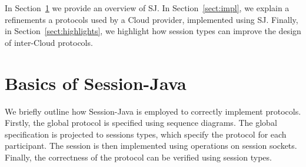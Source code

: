 \documentclass[10pt]{llncs}
\begin{document}


In Section~\ref{sect:basics} we provide an overview of SJ.
In Section~\ref{sect:impl}, we explain a refinements a protocols used by a Cloud provider, implemented using SJ. %
Finally, in Section~\ref{sect:highlights}, we highlight how session types can improve the design of inter-Cloud protocols.


\section{Basics of Session-Java}
\label{sect:basics}

We briefly outline how Session-Java is employed to correctly implement protocols.
Firstly, the global protocol is specified using sequence diagrams. The global specification is projected to sessions types, which specify the protocol for each participant.
The session is then implemented using operations on session sockets. Finally, the correctness of the protocol can be verified using session types.

\end{document}
